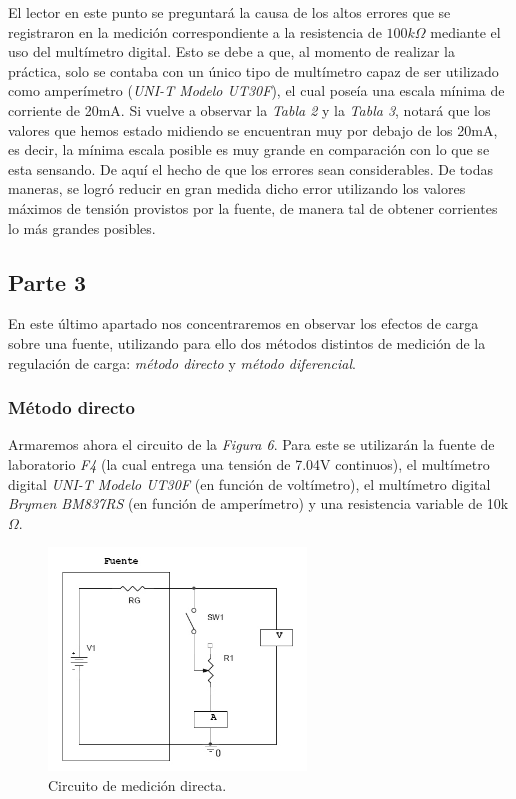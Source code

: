 \documentclass{article}
\begin{document}
	El lector en este punto se preguntará la causa de los altos errores que se registraron en la medición correspondiente a la resistencia de $100k\Omega$ mediante el uso del multímetro digital. Esto se debe a que, al momento de realizar la práctica, solo se contaba con un único tipo de multímetro capaz de ser utilizado como amperímetro (\textit{UNI-T Modelo UT30F}), el cual poseía una escala mínima de corriente de 20mA. Si  vuelve a observar la \textit{Tabla 2} y la \textit{Tabla 3}, notará que los valores que hemos estado midiendo se encuentran muy por debajo de los 20mA, es decir, la mínima escala posible es muy grande en comparación con lo que se esta sensando. De aquí el hecho de que los errores sean considerables. De todas maneras, se logró reducir en gran medida dicho error utilizando los valores máximos de tensión provistos por la fuente, de manera tal de obtener corrientes lo más grandes posibles.
\bigskip\bigskip




\subsection{Parte 3}

	En este último apartado nos concentraremos en observar los efectos de carga sobre una fuente, utilizando para ello dos métodos distintos de medición de la regulación de carga: \textit{método directo} y \textit{método diferencial}.
\bigskip



\subsubsection{Método directo}

	Armaremos ahora el circuito de la \textit{Figura 6}. Para este se utilizarán la fuente de laboratorio \textit{F4} (la cual entrega una tensión de 7.04V continuos), el multímetro digital \textit{UNI-T Modelo UT30F} (en función de voltímetro), el multímetro digital \textit{Brymen BM837RS} (en función de amperímetro) y una resistencia variable de 10k$\Omega$.
\bigskip


\begin{figure}[h]
	\centering
	\includegraphics[width=0.61\textwidth]{images/p3-item-a.jpg}
	\caption{Circuito de medición directa.}
\end{figure}
\bigskip\bigskip
\end{document}
